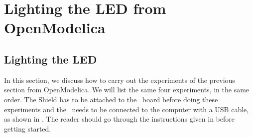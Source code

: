 \section{Lighting the LED from OpenModelica}
\subsection{Lighting the LED}
\label{sec:light-OpenModelica}
In this section, we discuss how to carry out the experiments of the
previous section from OpenModelica.  We will list the same four experiments,
in the same order.  The Shield has to be attached to the \arduino\ board
before doing these experiments and the \arduino\ needs to be connected to the computer 
with a USB cable, as shown in .
The reader should go through the instructions given in
 before getting started.

